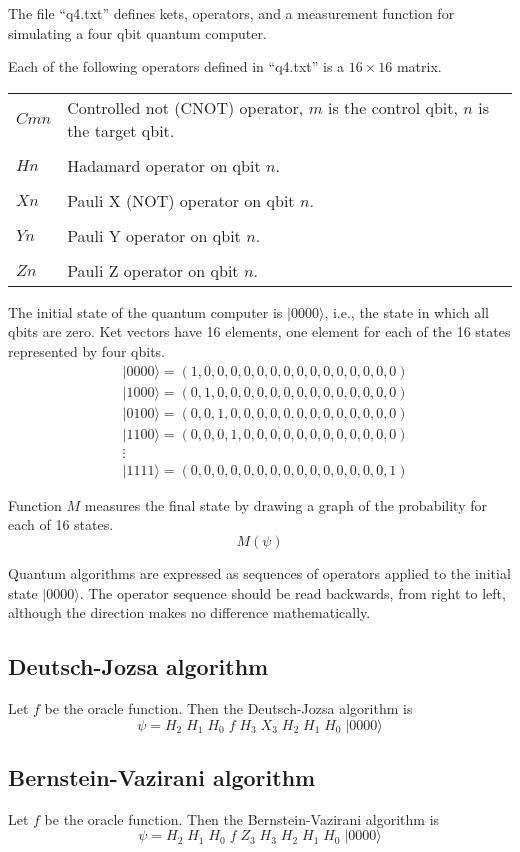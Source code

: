 \documentclass[12pt]{article}
\begin{document}
\noindent
The file ``q4.txt'' defines kets, operators, and a measurement function
for simulating a four qbit quantum computer.

\bigskip
\noindent
Each of the following operators defined in ``q4.txt'' is a $16\times16$ matrix.

\bigskip
\begin{tabular}{l l}
$Cmn$ & Controlled not (CNOT) operator, $m$ is the control qbit, $n$ is the target qbit.
\\
\\
$Hn$ & Hadamard operator on qbit $n$.
\\
\\
$Xn$ & Pauli X (NOT) operator on qbit $n$.
\\
\\
$Yn$ & Pauli Y operator on qbit $n$.
\\
\\
$Zn$ & Pauli Z operator on qbit $n$.
\end{tabular}

\bigskip
\noindent
The initial state of the quantum computer is $|0000\rangle$,
i.e., the state in which all qbits are zero.
Ket vectors have 16 elements, one element for each of the 16 states represented by four qbits.
\begin{align*}
&|0000\rangle=(1,0,0,0,0,0,0,0,0,0,0,0,0,0,0,0)
\\
&|1000\rangle=(0,1,0,0,0,0,0,0,0,0,0,0,0,0,0,0)
\\
&|0100\rangle=(0,0,1,0,0,0,0,0,0,0,0,0,0,0,0,0)
\\
&|1100\rangle=(0,0,0,1,0,0,0,0,0,0,0,0,0,0,0,0)
\\
&\vdots
\\
&|1111\rangle=(0,0,0,0,0,0,0,0,0,0,0,0,0,0,0,1)
\end{align*}

\bigskip
\noindent
Function $M$ measures the final state by drawing a graph of the probability
for each of 16 states.
\begin{equation*}
M(\psi)
\end{equation*}

\noindent
Quantum algorithms are expressed as sequences of operators applied
to the initial state $|0000\rangle$.
The operator sequence should be read backwards, from right to left,
although the direction makes no difference mathematically.

\subsection*{Deutsch-Jozsa algorithm}
Let $f$ be the oracle function.
Then the Deutsch-Jozsa algorithm is
\begin{equation*}
\psi = H_2 \; H_1 \; H_0 \; f \; H_3 \; X_3 \; H_2 \; H_1 \; H_0 \; |0000\rangle
\end{equation*}

\subsection*{Bernstein-Vazirani algorithm}
Let $f$ be the oracle function.
Then the Bernstein-Vazirani algorithm is
\begin{equation*}
\psi = H_2 \; H_1 \; H_0 \; f \; Z_3 \; H_3 \; H_2 \; H_1 \; H_0 \; |0000\rangle
\end{equation*}
\end{document}
